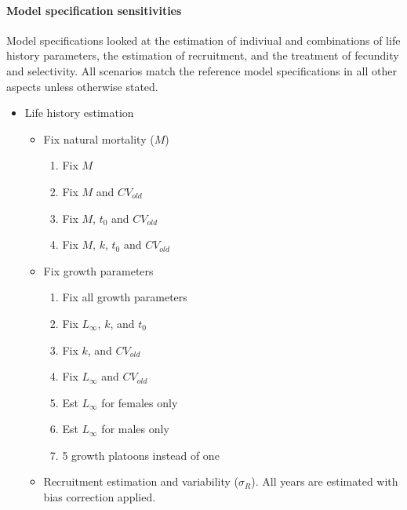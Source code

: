 \documentclass[11pt,
  english,
  letterpaper,
]{article}
\providecommand{\tightlist}{%
  \setlength{\itemsep}{0pt}\setlength{\parskip}{0pt}}
\providecommand{\tightlist}{%
  \setlength{\itemsep}{0pt}\setlength{\parskip}{0pt}}
\begin{document}
\hypertarget{model-specification-sensitivities}{%
\paragraph{Model specification sensitivities}\label{model-specification-sensitivities}}

Model specifications looked at the estimation of indiviual and combinations of life history parameters, the estimation of recruitment, and the treatment of fecundity and selectivity. All scenarios match the reference model specifications in all other aspects unless otherwise stated.

\begin{itemize}
\tightlist
\item
  Life history estimation

  \begin{itemize}
  \tightlist
  \item
    Fix natural mortality (\(M\))

    \begin{enumerate}
    \def\labelenumi{\arabic{enumi}.}
    \tightlist
    \item
      Fix \(M\)
    \item
      Fix \(M\) and \(CV_{old}\)
    \item
      Fix \(M\), \(t_0\) and \(CV_{old}\)
    \item
      Fix \(M\), \(k\), \(t_0\) and \(CV_{old}\)
    \end{enumerate}
  \item
    Fix growth parameters

    \begin{enumerate}
    \def\labelenumi{\arabic{enumi}.}
    \setcounter{enumi}{4}
    \tightlist
    \item
      Fix all growth parameters
    \item
      Fix \(L_{\infty}\), \(k\), and \(t_0\)
    \item
      Fix \(k\), and \(CV_{old}\)
    \item
      Fix \(L_{\infty}\) and \(CV_{old}\)
    \item
      Est \(L_{\infty}\) for females only
    \item
      Est \(L_{\infty}\) for males only
    \item
      5 growth platoons instead of one
    \end{enumerate}
  \item
    Recruitment estimation and variability (\(\sigma_R\)). All years are estimated with bias correction applied.


\end{itemize}
\end{itemize}
\end{document}
